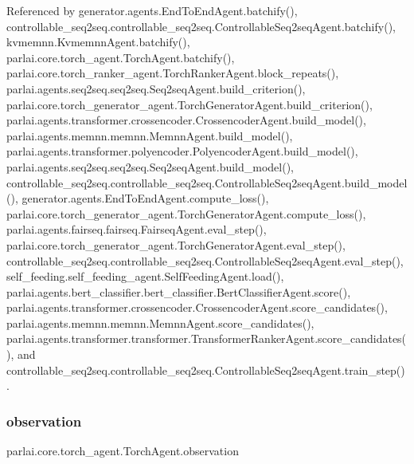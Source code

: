 Referenced by generator.\+agents.\+End\+To\+End\+Agent.\+batchify(), controllable\+\_\+seq2seq.\+controllable\+\_\+seq2seq.\+Controllable\+Seq2seq\+Agent.\+batchify(), kvmemnn.\+Kvmemnn\+Agent.\+batchify(), parlai.\+core.\+torch\+\_\+agent.\+Torch\+Agent.\+batchify(), parlai.\+core.\+torch\+\_\+ranker\+\_\+agent.\+Torch\+Ranker\+Agent.\+block\+\_\+repeats(), parlai.\+agents.\+seq2seq.\+seq2seq.\+Seq2seq\+Agent.\+build\+\_\+criterion(), parlai.\+core.\+torch\+\_\+generator\+\_\+agent.\+Torch\+Generator\+Agent.\+build\+\_\+criterion(), parlai.\+agents.\+transformer.\+crossencoder.\+Crossencoder\+Agent.\+build\+\_\+model(), parlai.\+agents.\+memnn.\+memnn.\+Memnn\+Agent.\+build\+\_\+model(), parlai.\+agents.\+transformer.\+polyencoder.\+Polyencoder\+Agent.\+build\+\_\+model(), parlai.\+agents.\+seq2seq.\+seq2seq.\+Seq2seq\+Agent.\+build\+\_\+model(), controllable\+\_\+seq2seq.\+controllable\+\_\+seq2seq.\+Controllable\+Seq2seq\+Agent.\+build\+\_\+model(), generator.\+agents.\+End\+To\+End\+Agent.\+compute\+\_\+loss(), parlai.\+core.\+torch\+\_\+generator\+\_\+agent.\+Torch\+Generator\+Agent.\+compute\+\_\+loss(), parlai.\+agents.\+fairseq.\+fairseq.\+Fairseq\+Agent.\+eval\+\_\+step(), parlai.\+core.\+torch\+\_\+generator\+\_\+agent.\+Torch\+Generator\+Agent.\+eval\+\_\+step(), controllable\+\_\+seq2seq.\+controllable\+\_\+seq2seq.\+Controllable\+Seq2seq\+Agent.\+eval\+\_\+step(), self\+\_\+feeding.\+self\+\_\+feeding\+\_\+agent.\+Self\+Feeding\+Agent.\+load(), parlai.\+agents.\+bert\+\_\+classifier.\+bert\+\_\+classifier.\+Bert\+Classifier\+Agent.\+score(), parlai.\+agents.\+transformer.\+crossencoder.\+Crossencoder\+Agent.\+score\+\_\+candidates(), parlai.\+agents.\+memnn.\+memnn.\+Memnn\+Agent.\+score\+\_\+candidates(), parlai.\+agents.\+transformer.\+transformer.\+Transformer\+Ranker\+Agent.\+score\+\_\+candidates(), and controllable\+\_\+seq2seq.\+controllable\+\_\+seq2seq.\+Controllable\+Seq2seq\+Agent.\+train\+\_\+step().

\mbox{\label{classparlai_1_1core_1_1torch__agent_1_1TorchAgent_a4bc525b20568822a042b3bbfa3da3a69}} 
\subsubsection{\texorpdfstring{observation}{observation}}
{\footnotesize\ttfamily parlai.\+core.\+torch\+\_\+agent.\+Torch\+Agent.\+observation}



